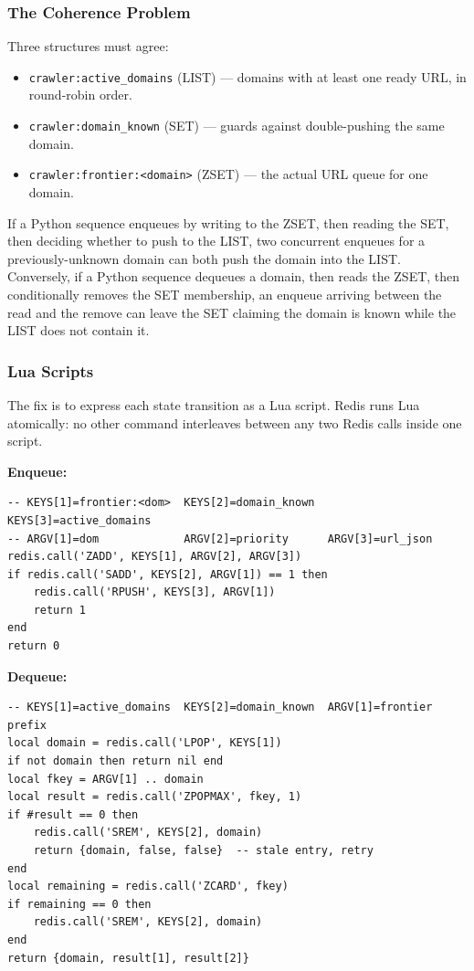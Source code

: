 \documentclass[11pt,a4paper]{article}
\newcommand{\code}[1]{\texttt{#1}}
\begin{document}
\subsubsection{The Coherence Problem}

Three structures must agree:

\begin{itemize}[leftmargin=1.4em]
  \item \code{crawler:active\_domains} (LIST) --- domains with at least one ready URL, in round-robin order.
  \item \code{crawler:domain\_known} (SET) --- guards against double-pushing the same domain.
  \item \code{crawler:frontier:<domain>} (ZSET) --- the actual URL queue for one domain.
\end{itemize}

If a Python sequence enqueues by writing to the ZSET, then reading the SET, then deciding whether to push to the LIST, two concurrent enqueues for a previously-unknown domain can both push the domain into the LIST. Conversely, if a Python sequence dequeues a domain, then reads the ZSET, then conditionally removes the SET membership, an enqueue arriving between the read and the remove can leave the SET claiming the domain is known while the LIST does not contain it.

\subsubsection{Lua Scripts}

The fix is to express each state transition as a Lua script. Redis runs Lua atomically: no other command interleaves between any two Redis calls inside one script.

\textbf{Enqueue:}

\begin{lstlisting}
-- KEYS[1]=frontier:<dom>  KEYS[2]=domain_known  KEYS[3]=active_domains
-- ARGV[1]=dom             ARGV[2]=priority      ARGV[3]=url_json
redis.call('ZADD', KEYS[1], ARGV[2], ARGV[3])
if redis.call('SADD', KEYS[2], ARGV[1]) == 1 then
    redis.call('RPUSH', KEYS[3], ARGV[1])
    return 1
end
return 0
\end{lstlisting}

\textbf{Dequeue:}

\begin{lstlisting}
-- KEYS[1]=active_domains  KEYS[2]=domain_known  ARGV[1]=frontier prefix
local domain = redis.call('LPOP', KEYS[1])
if not domain then return nil end
local fkey = ARGV[1] .. domain
local result = redis.call('ZPOPMAX', fkey, 1)
if #result == 0 then
    redis.call('SREM', KEYS[2], domain)
    return {domain, false, false}  -- stale entry, retry
end
local remaining = redis.call('ZCARD', fkey)
if remaining == 0 then
    redis.call('SREM', KEYS[2], domain)
end
return {domain, result[1], result[2]}
\end{lstlisting}
\end{document}
